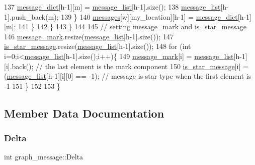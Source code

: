 \begin{DoxyCode}
137           \hyperlink{classgraph__message_ad0a6d35ac8550fb7ff03ce90fce7d5a5}{message\_dict}[h-1][m] = \hyperlink{classgraph__message_aa17fdb629b423343edfafa97252763ef}{message\_list}[h-1].size();
138           \hyperlink{classgraph__message_aa17fdb629b423343edfafa97252763ef}{message\_list}[h-1].push\_back(m);
139         \}
140         \hyperlink{classgraph__message_aac77e098f0acf9650116a8e51fe3b4b7}{messages}[w][my\_location][h-1] = \hyperlink{classgraph__message_ad0a6d35ac8550fb7ff03ce90fce7d5a5}{message\_dict}[h-1][m];
141       \}
142     \}
143   \}
144 
145   \textcolor{comment}{// setting message\_mark and is\_star\_message}
146   \hyperlink{classgraph__message_a49d9af5150daf0599c29fe18cb032fa5}{message\_mark}.resize(\hyperlink{classgraph__message_aa17fdb629b423343edfafa97252763ef}{message\_list}[h-1].size());
147   \hyperlink{classgraph__message_a55ff5531a0043106369e84a7bc45e22d}{is\_star\_message}.resize(\hyperlink{classgraph__message_aa17fdb629b423343edfafa97252763ef}{message\_list}[h-1].size());
148   \textcolor{keywordflow}{for} (\textcolor{keywordtype}{int} i=0;i<\hyperlink{classgraph__message_aa17fdb629b423343edfafa97252763ef}{message\_list}[h-1].size();i++)\{
149     \hyperlink{classgraph__message_a49d9af5150daf0599c29fe18cb032fa5}{message\_mark}[i] = \hyperlink{classgraph__message_aa17fdb629b423343edfafa97252763ef}{message\_list}[h-1][i].back(); \textcolor{comment}{// the last element is the mark
       component}
150     \hyperlink{classgraph__message_a55ff5531a0043106369e84a7bc45e22d}{is\_star\_message}[i] = (\hyperlink{classgraph__message_aa17fdb629b423343edfafa97252763ef}{message\_list}[h-1][i][0] == -1); \textcolor{comment}{// message is star
       type when the first element is -1}
151   \}
152 
153 \}
\end{DoxyCode}


\subsection{Member Data Documentation}
\mbox{\label{classgraph__message_a45dfd061b7bc73572e5132fbf66efd55}} 
\subsubsection{\texorpdfstring{Delta}{Delta}}
{\footnotesize\ttfamily int graph\+\_\+message\+::\+Delta\hspace{0.3cm}{\ttfamily [private]}}



